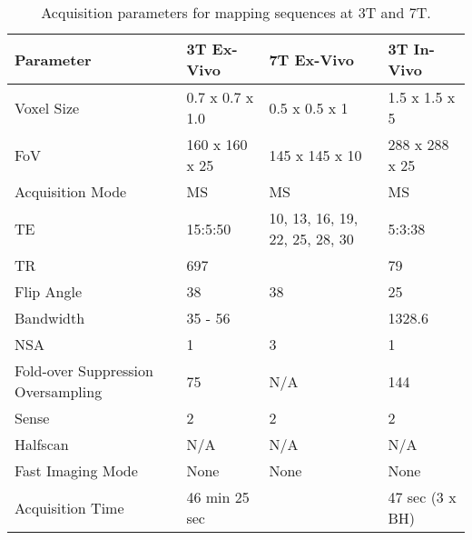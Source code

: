\begin{table}[H]
	\centering
	\begin{tabularx}{1.0\textwidth}{|X|X|X|X|}
		\hline
		Parameter                          & 3T Ex-Vivo      & 7T Ex-Vivo                     & 3T In-Vivo      \\ \hline
		Voxel Size                         & 0.7 x 0.7 x 1.0 & 0.5 x 0.5 x 1                  & 1.5 x 1.5 x 5   \\ \hline
		FoV                                & 160 x 160 x 25  & 145 x 145 x 10                 & 288 x 288 x 25  \\ \hline
		Acquisition Mode                   & MS              & MS                             & MS              \\ \hline
		TE                                 & 15:5:50         & 10, 13, 16, 19, 22, 25, 28, 30 & 5:3:38          \\ \hline
		TR                                 & 697             &                                & 79              \\ \hline
		Flip Angle                         & 38              & 38                             & 25              \\ \hline
		Bandwidth                          & 35 - 56         &                                & 1328.6          \\ \hline
		NSA                                & 1               & 3                              & 1               \\ \hline
		Fold-over Suppression Oversampling & 75              & N/A                            & 144             \\ \hline
		Sense                              & 2               & 2                              & 2               \\ \hline
		Halfscan                           & N/A             & N/A                            & N/A             \\ \hline
		Fast Imaging Mode                  & None            & None                           & None            \\ \hline
		Acquisition Time                   & 46 min 25 sec   &                                & 47 sec (3 x BH) \\ \hline
	\end{tabularx}
	\caption{Acquisition parameters for \ttwostar mapping sequences at 3T and 7T.}
	\label{tab:ex_t2star_mapping}
\end{table}

